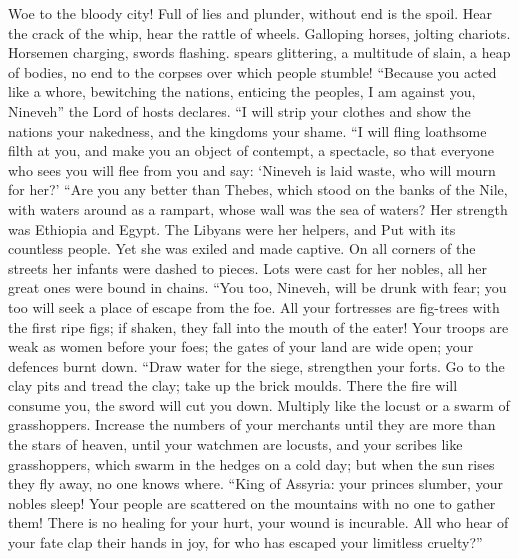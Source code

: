  Woe to the bloody city! Full of lies and plunder, without
end is the spoil.  Hear the crack of the whip, hear the
rattle of wheels. Galloping horses, jolting chariots. 
Horsemen charging, swords flashing. spears glittering, a multitude of
slain, a heap of bodies, no end to the corpses over which people
stumble!  ``Because you acted like a whore, bewitching the
nations, enticing the peoples,  I am against you, Nineveh''
the Lord of hosts declares. ``I will strip your clothes and show the
nations your nakedness, and the kingdoms your shame.  ``I
will fling loathsome filth at you, and make you an object of contempt, a
spectacle,  so that everyone who sees you will flee from you
and say: `Nineveh is laid waste, who will mourn for her?' 
``Are you any better than Thebes, which stood on the banks of the Nile,
with waters around as a rampart, whose wall was the sea of waters?
 Her strength was Ethiopia and Egypt. The Libyans were her
helpers, and Put with its countless people.  Yet she was
exiled and made captive. On all corners of the streets her infants were
dashed to pieces. Lots were cast for her nobles, all her great ones were
bound in chains.  ``You too, Nineveh, will be drunk with
fear; you too will seek a place of escape from the foe. 
All your fortresses are fig-trees with the first ripe figs; if shaken,
they fall into the mouth of the eater!  Your troops are
weak as women before your foes; the gates of your land are wide open;
your defences burnt down.  ``Draw water for the siege,
strengthen your forts. Go to the clay pits and tread the clay; take up
the brick moulds.  There the fire will consume you, the
sword will cut you down. Multiply like the locust or a swarm of
grasshoppers.  Increase the numbers of your merchants until
they are more than the stars of heaven,  until your
watchmen are locusts, and your scribes like grasshoppers, which swarm in
the hedges on a cold day; but when the sun rises they fly away, no one
knows where.  ``King of Assyria: your princes slumber, your
nobles sleep! Your people are scattered on the mountains with no one to
gather them!  There is no healing for your hurt, your wound
is incurable. All who hear of your fate clap their hands in joy, for who
has escaped your limitless cruelty?''
